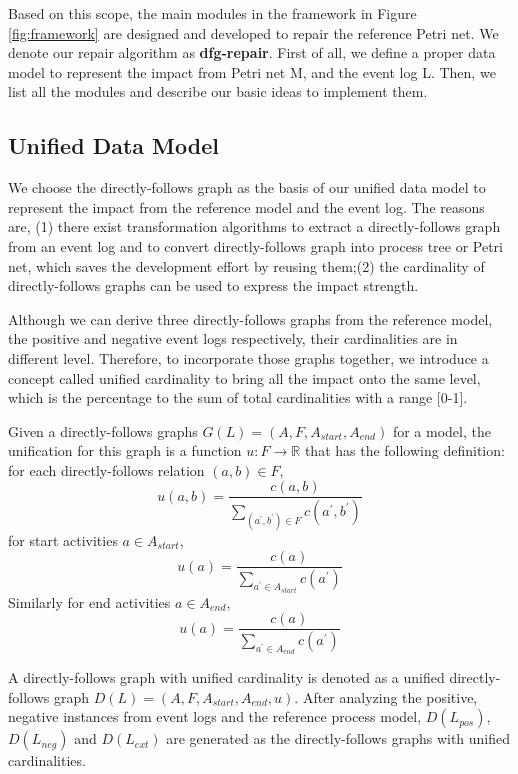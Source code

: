 Based on this scope, the main modules in the framework in Figure \ref{fig:framework} are designed and developed to repair the reference Petri net. We denote our repair algorithm as \textbf{dfg-repair}. First of all, we define a proper data model to represent the impact from Petri net M, and the event log L. Then, we list all the modules  and describe our basic ideas to implement them. 
\subsection{Unified Data Model}
We choose the directly-follows graph as the basis of our unified data model to represent the impact from the reference model and the event log. The reasons are, (1) there exist transformation algorithms to extract a directly-follows graph from an event log and to convert directly-follows graph into process tree or Petri net, which saves the development effort by reusing them;(2) the cardinality of directly-follows graphs can be used to express the impact strength.

Although we can derive three directly-follows graphs from the reference model, the positive and negative event logs respectively, their cardinalities are in different level. Therefore, to incorporate those graphs together, we introduce a concept called unified cardinality to bring all the impact onto the same level, which is the percentage to the sum of total cardinalities with a range [0-1].
\begin{definition} 
	\label{def:car-unification}
	Given a directly-follows graphs $G(L)  = (A, F , A_{start}, A_{end})$ for a model, the unification for this graph is a function  $u:F\rightarrow \mathbb{R} $ that has the following definition: \\
	for each directly-follows relation $(a,b) \in F$,
	\[ u(a,b) = \frac{c(a,b)}{\sum_{(a^\prime,b^\prime) \in F} c(a^\prime,b^\prime)}\]
	for start activities $a \in A_{start}$, 
	\[ u(a) = \frac{c(a)}{\sum_{a^\prime \in A_{start}} c(a^\prime)} \]
	Similarly for end activities $a \in A_{end}$,
	\[ u(a) = \frac{c(a)}{\sum_{a^\prime \in A_{end}} c(a^\prime)} \]
\end{definition}
A directly-follows graph with unified cardinality is denoted as a unified directly-follows graph $D(L)=(A, F , A_{start}, A_{end}, u)$. After analyzing the positive, negative instances from event logs and the reference process model, $D(L_{pos})$, $D(L_{neg})$ and $D(L_{ext})$ are generated as the directly-follows graphs with unified cardinalities.
